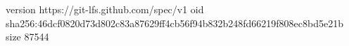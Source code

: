 version https://git-lfs.github.com/spec/v1
oid sha256:46dcf0820d73d802c83a87629ff4cb56f94b832b248fd66219f808ec8bd5e21b
size 87544

